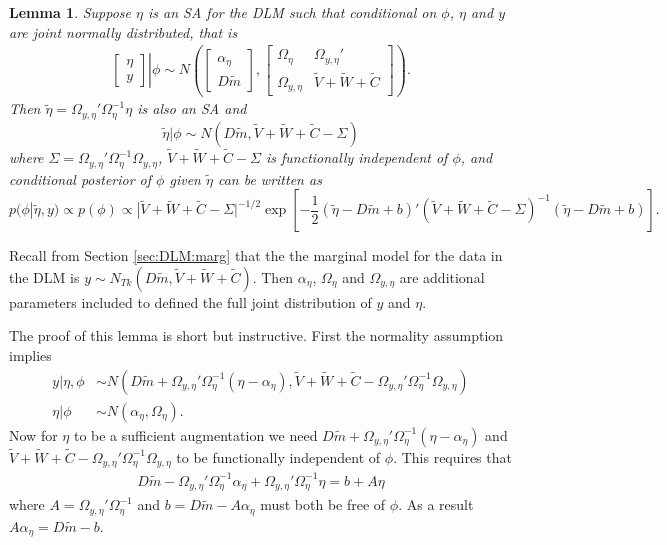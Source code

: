 \documentclass{article}
\newtheorem{lem}[thm]{Lemma}
\begin{document}
\begin{lem}\label{noSA}
Suppose $\eta$ is an SA for the DLM such that conditional on $\phi$, $\eta$ and $y$ are joint normally distributed, that is 
\begin{align*}
 \left. \begin{bmatrix}\eta \\ y \end{bmatrix}\right|\phi \sim N\left(\begin{bmatrix} \alpha_\eta \\ D\tilde{m} \end{bmatrix}, \begin{bmatrix} 
   \Omega_\eta & \Omega_{y,\eta}' \\
   \Omega_{y,\eta} & \tilde{V} + \tilde{W} + \tilde{C} \end{bmatrix}\right).
\end{align*}
Then $\tilde{\eta}=\Omega_{y,\eta}'\Omega_{\eta}^{-1}\eta$ is also an SA and
\[
\tilde{\eta}|\phi \sim N(D\tilde{m},\tilde{V} + \tilde{W} + \tilde{C} - \Sigma)
\]
where $\Sigma=\Omega_{y,\eta}'\Omega_{\eta}^{-1}\Omega_{y,\eta}$, $\tilde{V} + \tilde{W} + \tilde{C} - \Sigma$ is functionally independent of $\phi$, and conditional posterior of $\phi$ given $\tilde{\eta}$ can be written as
\[
p(\phi|\tilde{\eta},y) \propto p(\phi)\propto |\tilde{V} + \tilde{W} + \tilde{C} - \Sigma|^{-1/2}\exp\left[-\frac{1}{2}(\tilde{\eta} - D\tilde{m} + b)'(\tilde{V} + \tilde{W} + \tilde{C} - \Sigma)^{-1}(\tilde{\eta} - D\tilde{m} + b)\right].
\]
\end{lem}
Recall from Section \ref{sec:DLM:marg} that the the marginal model for the data in the DLM is $y\sim N_{Tk}(D\tilde{m}, \tilde{V} + \tilde{W} + \tilde{C})$. Then $\alpha_\eta$, $\Omega_\eta$ and $\Omega_{y,\eta}$ are additional parameters included to defined the full joint distribution of $y$ and $\eta$. 

The proof of this lemma is short but instructive. First the normality assumption implies
\begin{align*}
  y|\eta,\phi &\sim N(D\tilde{m} + \Omega_{y,\eta}'\Omega_\eta^{-1}(\eta - \alpha_\eta), \tilde{V} + \tilde{W} + \tilde{C}- \Omega_{y,\eta}'\Omega_{\eta}^{-1}\Omega_{y,\eta})\\
  \eta|\phi &\sim N(\alpha_\eta, \Omega_\eta).
\end{align*}
Now for $\eta$ to be a sufficient augmentation we need $D\tilde{m} + \Omega_{y,\eta}'\Omega_\eta^{-1}(\eta - \alpha_\eta)$ and $\tilde{V} + \tilde{W} + \tilde{C} - \Omega_{y,\eta}'\Omega_{\eta}^{-1}\Omega_{y,\eta}$ to be functionally independent of $\phi$. This requires that
\begin{align*}
  D\tilde{m} - \Omega_{y,\eta}'\Omega_\eta^{-1}\alpha_\eta + \Omega_{y,\eta}'\Omega_\eta^{-1}\eta  = b + A\eta
\end{align*}
where $A=\Omega_{y,\eta}'\Omega_\eta^{-1}$ and $b=D\tilde{m} - A\alpha_\eta$ must both be free of $\phi$. As a result $A\alpha_\eta = D\tilde{m} - b$.
\end{document}
